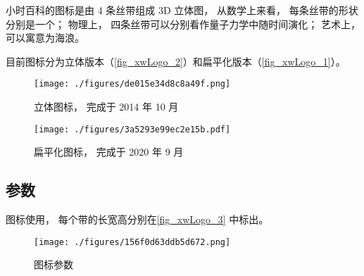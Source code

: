 
小时百科的图标是由 4 条丝带组成 3D 立体图， 从数学上来看， 每条丝带的形状分别是一个； 物理上， 四条丝带可以分别看作量子力学中随时间演化； 艺术上， 可以寓意为海浪。

目前图标分为立体版本（\autoref{fig_xwLogo_2}）和扁平化版本（\autoref{fig_xwLogo_1}）。

\begin{figure}[ht]
\centering
\texttt{[image: ./figures/de015e34d8c8a49f.png]}
\caption{立体图标， 完成于 2014 年 10 月} \label{fig_xwLogo_2}
\end{figure}

\begin{figure}[ht]
\centering
\texttt{[image: ./figures/3a5293e99ec2e15b.pdf]}
\caption{扁平化图标， 完成于 2020 年 9 月} \label{fig_xwLogo_1}
\end{figure}

\subsection{参数}
图标使用， 每个带的长宽高分别在\autoref{fig_xwLogo_3} 中标出。
\begin{figure}[ht]
\centering
\texttt{[image: ./figures/156f0d63ddb5d672.png]}
\caption{图标参数} \label{fig_xwLogo_3}
\end{figure}

